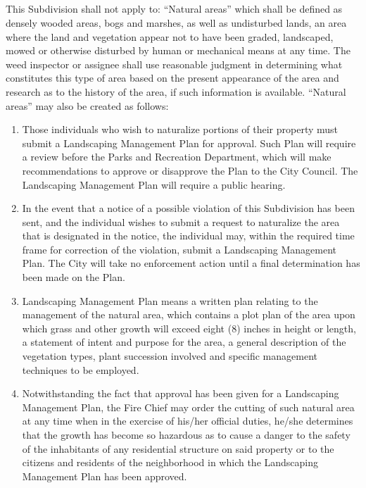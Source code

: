 \subsection{}
This Subdivision shall not apply to: “Natural areas” which shall be defined as densely wooded areas, bogs and marshes, as well as undisturbed lands, an area where the land and vegetation appear not to have been graded, landscaped, mowed or otherwise disturbed by human or mechanical means at any time. The weed inspector or assignee shall use reasonable judgment in determining what constitutes this type of area based on the present appearance of the area and research as to the history of the area, if such information is available. “Natural areas” may also be created as follows:
\begin{enumerate}[{\indent}1)]
    \item Those individuals who wish to naturalize portions of their property must submit a Landscaping Management Plan for approval.  Such Plan will require a review before the Parks and Recreation Department, which will make recommendations to approve or disapprove the Plan to the City Council.  The Landscaping Management Plan will require a public hearing.
    \item In the event that a notice of a possible violation of this Subdivision has been sent, and the individual wishes to submit a request to naturalize the area that is designated in the notice, the individual may, within the required time frame for correction of the violation, submit a Landscaping Management Plan.  The City will take no enforcement action until a final determination has been made on the Plan.
    \item Landscaping Management Plan means a written plan relating to the management of the natural area, which contains a plot plan of the area upon which grass and other growth will exceed eight (8) inches in height or length, a statement of intent and purpose for the area, a general description of the vegetation types, plant succession involved and specific management techniques to be employed.
    \item Notwithstanding the fact that approval has been given for a Landscaping Management Plan, the Fire Chief may order the cutting of such natural area at any time when in the exercise of his/her official duties, he/she determines that the growth has become so hazardous as to cause a danger to the safety of the inhabitants of any residential structure on said property or to the citizens and residents of the neighborhood in which the Landscaping Management Plan has been approved.
\end{enumerate}

